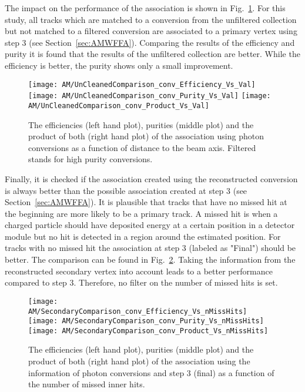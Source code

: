 The impact on the performance of the association is shown in Fig.~\ref{plot:AMWFSVpcEffAndPurRT}. For this study, all tracks which are matched to a conversion from the unfiltered collection but not matched to a filtered conversion are associated to a primary vertex using step 3 (see Section~\ref{sec:AMWFFA}). Comparing the results of the efficiency and purity it is found that the results of the unfiltered collection are better. While the efficiency is better, the purity shows only a small improvement.

\begin{figure}[!ht]
    \centering
    \texttt{[image: AM/UnCleanedComparison\_conv\_Efficiency\_Vs\_Val]}
    \texttt{[image: AM/UnCleanedComparison\_conv\_Purity\_Vs\_Val]}
    \texttt{[image: AM/UnCleanedComparison\_conv\_Product\_Vs\_Val]}
    \caption[Efficiencies, purities and their product of the association using different photon conversion collections as a function of distance to the beam axis]{The efficiencies (left hand plot), purities (middle plot) and the product of both (right hand plot) of the association using photon conversions as a function of distance to the beam axis. Filtered stands for high purity conversions.\label{plot:AMWFSVpcEffAndPurRT}}
\end{figure}

Finally, it is checked if the association created using the reconstructed conversion is always better than the possible association created at step 3 (see Section~\ref{sec:AMWFFA}). It is plausible that tracks that have no missed hit at the beginning are more likely to be a primary track. A missed hit is when a charged particle should have deposited energy at a certain position in a detector module but no hit is detected in a region around the estimated position. For tracks with no missed hit the association at step 3 (labeled as "Final") should be better. The comparison can be found in Fig.~\ref{plot:AMWFSVpcEffAndPurVsFA}. Taking the information from the reconstructed secondary vertex into account leads to a better performance compared to step 3. Therefore, no filter on the number of missed hits is set.

\begin{figure}[!ht]
    \centering
    \texttt{[image: AM/SecondaryComparison\_conv\_Efficiency\_Vs\_nMissHits]}
    \texttt{[image: AM/SecondaryComparison\_conv\_Purity\_Vs\_nMissHits]}
    \texttt{[image: AM/SecondaryComparison\_conv\_Product\_Vs\_nMissHits]}
    \caption[Efficiencies, purities and their product of the association using photon conversions \vs{} step 3 as a function of missed inner hits]{The efficiencies (left hand plot), purities (middle plot) and the product of both (right hand plot) of the association using the information of photon conversions and step 3 (final) as a function of the number of missed inner hits.\label{plot:AMWFSVpcEffAndPurVsFA}}
\end{figure}

